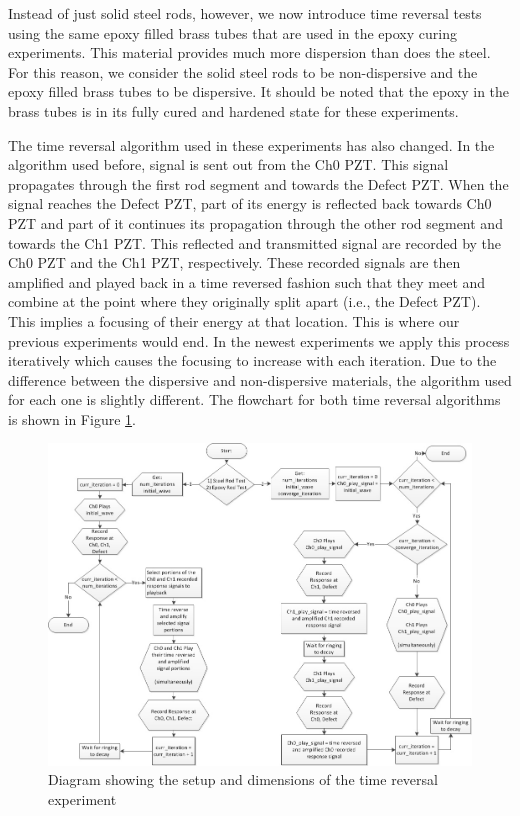 \documentclass[]{aiaa-tc}%
\begin{document}
Instead of just solid steel rods, however, we now introduce time reversal tests using the same epoxy filled brass tubes that are used in the epoxy curing experiments. This material provides much more dispersion than does the steel. For this reason, we consider the solid steel rods to be non-dispersive and the epoxy filled brass tubes to be dispersive. It should be noted that the epoxy in the brass tubes is in its fully cured and hardened state for these experiments. 

The time reversal algorithm used in these experiments has also changed. In the algorithm used before, signal is sent out from the Ch0 PZT. This signal propagates through the first rod segment and towards the Defect PZT. When the signal reaches the Defect PZT, part of its energy is reflected back towards Ch0 PZT and part of it continues its propagation through the other rod segment and towards the Ch1 PZT. This reflected and transmitted signal are recorded by the Ch0 PZT and the Ch1 PZT, respectively. These recorded signals are then amplified and played back in a time reversed fashion such that they meet and combine at the point where they originally split apart (i.e., the Defect PZT). This implies a focusing of their energy at that location. This is where our previous experiments would end. In the newest experiments we apply this process iteratively which causes the focusing to increase with each iteration. Due to the difference between the dispersive and non-dispersive materials, the algorithm used for each one is slightly different. The flowchart for both time reversal algorithms is shown in Figure \ref{fig:tr_flowchart}.

\begin{figure}[H]%
 \includegraphics{tr_flowchart}
 \centering
 \caption{Diagram showing the setup and dimensions of the time reversal experiment}
 \label{fig:tr_flowchart}
\end{figure}
\end{document}
